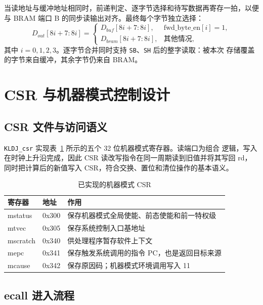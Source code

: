 \documentclass[UTF8,zihao=-4,a4paper]{ctexart}
\numberwithin{table}{section}
\numberwithin{figure}{section}
\newcommand{\code}[1]{\texttt{#1}}
\begin{document}
当读地址与缓冲地址相同时，前递判定、逐字节选择和待写数据再寄存一拍，以便与 BRAM
端口 B 的同步读输出对齐。最终每个字节独立选择：
\begin{equation}
  D_{out}[8i+7:8i]=
  \begin{cases}
    D_{buf}[8i+7:8i], & \mathrm{fwd\_byte\_en}[i]=1,\\
    D_{bram}[8i+7:8i], & \text{其他情况},
  \end{cases}
\end{equation}
其中 \(i=0,1,2,3\)。逐字节合并同时支持 \code{SB}、\code{SH} 后的整字读取：被本次
存储覆盖的字节来自缓冲，其余字节仍来自 BRAM。

\section{CSR 与机器模式控制设计}

\subsection{CSR 文件与访问语义}

\code{KLDJ\_csr} 实现表~\ref{tab:csr} 所示的五个 32 位机器模式寄存器。读端口为组合
逻辑，写入在时钟上升沿完成，因此 CSR 读改写指令在同一周期读到旧值并将其写回 rd，
同时把计算后的新值写入 CSR，符合交换、置位和清位操作的基本语义\cite{riscv-priv}。

\begin{table}[H]
  \centering
  \caption{已实现的机器模式 CSR}
  \label{tab:csr}
  \begin{tabularx}{\textwidth}{>{\ttfamily}p{2.5cm}>{\ttfamily}p{2.2cm}X}
    \toprule
    \normalfont 寄存器 & \normalfont 地址 & \normalfont 作用 \\
    \midrule
    mstatus  & 0x300 & 保存机器模式全局使能、前态使能和前一特权级 \\
    mtvec    & 0x305 & 保存系统控制入口基地址 \\
    mscratch & 0x340 & 供处理程序暂存软件上下文 \\
    mepc     & 0x341 & 保存触发系统调用的指令 PC，也是返回目标来源 \\
    mcause   & 0x342 & 保存原因码；机器模式环境调用写入 11 \\
    \bottomrule
  \end{tabularx}
\end{table}

\subsection{ecall 进入流程}
\end{document}
